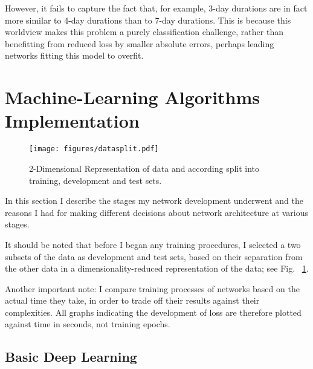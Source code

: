 \documentclass[10pt, twoside, a4paper]{article}
\begin{document}
	However, it fails to capture the fact that, for example, 3-day durations are in fact more 
	similar to 4-day durations than to 7-day durations. This is because this worldview makes 
	this problem a purely classification challenge, rather than benefitting from reduced loss
	by smaller absolute errors, perhaps leading networks fitting this model to overfit.

	\section{Machine-Learning Algorithms Implementation} %
%
	\begin{figure}
	\begin{center}
	\texttt{[image: figures/datasplit.pdf]}
	\end{center}
	\caption{2-Dimensional Representation of data and according split into training, 
	development and test sets.}
	\label{fig:tsne}
	\end{figure}

	In this section I describe the stages my network development underwent and the reasons I 
	had for making different decisions about network architecture at various stages.

	It should be noted that before I began any training procedures, I selected a two subsets of 
	the data as development and test sets, based on their separation from 
	the other data in a dimensionality-reduced representation of the data; see Fig.%
	\ \ref{fig:tsne}.

	Another important note: I compare training processes of networks based on the actual time they 
	take, in order to trade off their results against their complexities. All graphs 
	indicating the development of loss are therefore plotted against time in seconds, not 
	training epochs.

	\subsection{Basic Deep Learning}
\end{document}
